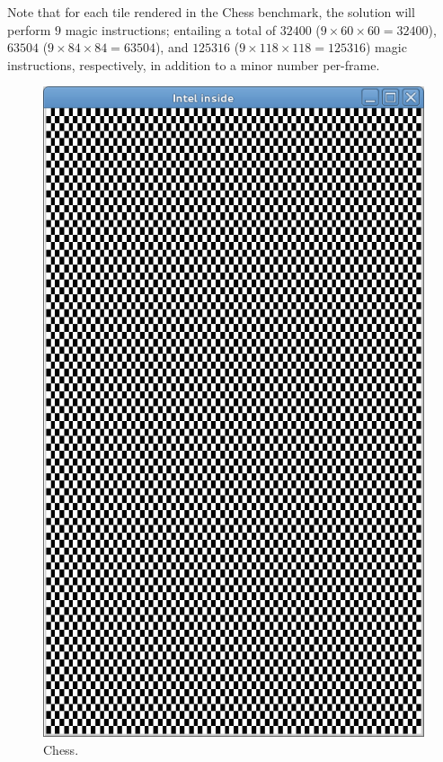 Note that for each tile rendered in the Chess benchmark, the solution will perform $9$ magic instructions; entailing a total of $32400$ ($9\times60\times60=32400$), $63504$ ($9\times84\times84=63504$), and $125316$ ($9\times118\times118=125316$) magic instructions, respectively, in addition to a minor number per-frame.

\begin{figure}
  \includegraphics[width=\linewidth]{img/imgchess.png}
  \caption[Chess benchmark screen capture]{Chess.}
  \label{fig:benchmarks_chess}
  \endminipage\hfill

\end{figure}
